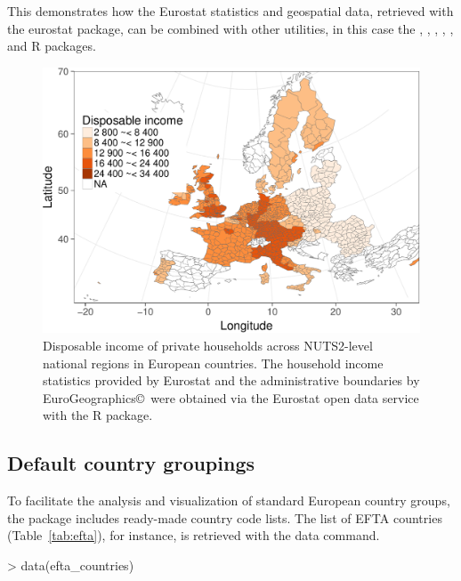 This demonstrates how the Eurostat statistics and geospatial data,
retrieved with the eurostat package, can be combined with other
utilities, in this case the
 \citep{grid},  \citep{maptools},  \citep{rgdal},
 \citep{rgeos},  \citep{scales}, and
 \citep{stringr} R packages.

\begin{figure}
\begin{center}
\includegraphics{2017-manu-mapexample-1}
\caption{Disposable income of private households across NUTS2-level national regions in European countries. The household income statistics provided by Eurostat and the administrative boundaries by EuroGeographics\copyright \  were obtained via the Eurostat open data service with the  R package.}
\label{fig:mapexample}
\end{center}
\end{figure}


\subsection{Default country groupings}

To facilitate the analysis and visualization of standard European
country groups, the  package includes ready-made
country code lists. The list of EFTA countries (Table~\ref{tab:efta}),
for instance, is retrieved with the data command.

\begin{example}
> data(efta_countries)
\end{example}

